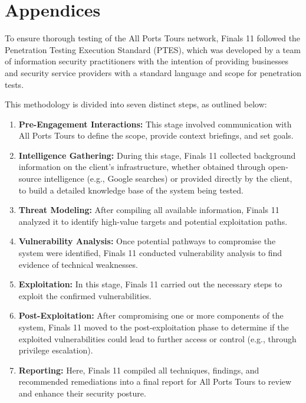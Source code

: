 \section{Appendices}

\renewcommand{\currentFindingColor}{black}
\renewcommand{\currentFindingBackground}{black}

 \label{sec:../appendix/entries/penetration-testing-execution-standard}
To ensure thorough testing of the All Ports Tours network, Finals 11 followed the Penetration Testing Execution Standard (PTES), which was developed by a team of information security practitioners with the intention of providing businesses and security service providers with a standard language and scope for penetration tests.

\bigskip


This methodology is divided into seven distinct steps, as outlined below:

\begin{enumerate}
\item \textbf{Pre-Engagement Interactions:} This stage involved communication with All Ports Tours to define the scope, provide context briefings, and set goals.\item \textbf{Intelligence Gathering:} During this stage, Finals 11 collected background information on the client’s infrastructure, whether obtained through open-source intelligence (e.g., Google searches) or provided directly by the client, to build a detailed knowledge base of the system being tested.\item \textbf{Threat Modeling:} After compiling all available information, Finals 11 analyzed it to identify high-value targets and potential exploitation paths.\item \textbf{Vulnerability Analysis: }Once potential pathways to compromise the system were identified, Finals 11 conducted vulnerability analysis to find evidence of technical weaknesses.\item \textbf{Exploitation:} In this stage, Finals 11 carried out the necessary steps to exploit the confirmed vulnerabilities.\item \textbf{Post-Exploitation:} After compromising one or more components of the system, Finals 11 moved to the post-exploitation phase to determine if the exploited vulnerabilities could lead to further access or control (e.g., through privilege escalation).\item \textbf{Reporting:} Here, Finals 11 compiled all techniques, findings, and recommended remediations into a final report for All Ports Tours to review and enhance their security posture.
\end{enumerate}
\newpage


